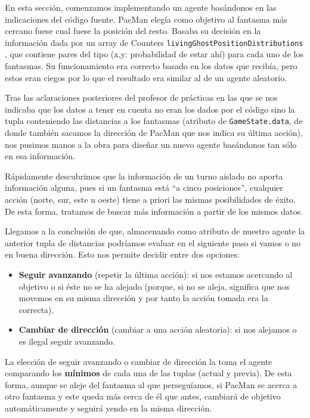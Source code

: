\documentclass[12pt]{article}
\begin{document}
En esta sección, comenzamos implementando un agente basándonos en las
indicaciones del código fuente. PacMan elegía como objetivo al fantasma más
cercano fuese cual fuese la posición del resto. Basaba su decisión en la
información dada por un array de Counters \texttt{livingGhostPositionDistributions}
, que contiene pares del tipo (x,y: probabilidad de estar ahí) para cada uno de
los fantasmas. Su funcionamiento era correcto basado en los datos que recibía,
pero estos eran ciegos por lo que el resultado era similar al de un agente
aleatorio.

Tras las aclaraciones posteriores del profesor de prácticas en las que se nos
indicaba que los datos a tener en cuenta no eran los dados por el código sino
la tupla conteniendo las distancias a los fantasmas (atributo de
\texttt{GameState.data}, de donde también sacamos la dirección de PacMan que nos
indica su última acción), nos pusimos manos a la obra para diseñar un nuevo
agente basándonos tan sólo en esa información.

Rápidamente descubrimos que la información de un turno aislado no aporta
información alguna, pues si un fantasma está ``a cinco posiciones'', cualquier
acción (norte, sur, este u oeste) tiene a priori las mismas posibilidades de
éxito. De esta forma, tratamos de buscar más información a partir de los mismos
datos.

Llegamos a la conclusión de que, almacenando como atributo de nuestro agente
la anterior tupla de distancias podríamos evaluar en el siguiente paso si vamos
o no en buena dirección. Esto nos permite decidir entre dos opciones:

\begin{itemize}
    \item \textbf{Seguir avanzando} (repetir la última acción): si nos estamos
    acercando al objetivo o si éste no se ha alejado (porque, si no se aleja,
    significa que nos movemos en su misma dirección y por tanto la acción
    tomada era la correcta).
    \item \textbf{Cambiar de dirección} (cambiar a una acción aleatoria): si
    nos alejamos o es ilegal seguir avanzando.
\end{itemize}

La elección de seguir avanzando o cambiar de dirección la toma el agente
comparando los \textbf{mínimos} de cada una de las tuplas (actual y previa). De
esta forma, aunque se aleje del fantasma al que perseguíamos, si PacMan se
acerca a otro fantasma y este queda más cerca de él que antes, cambiará de
objetivo automáticamente y seguirá yendo en la misma dirección.
\end{document}
